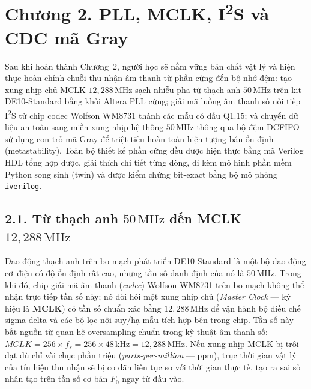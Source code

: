 \clearpage
{}
\section*{Chương 2. PLL, MCLK, I\textsuperscript{2}S và CDC mã Gray}

\begin{learningobj}
Sau khi hoàn thành Chương~2, người học sẽ nắm vững bản chất vật lý và hiện thực hoàn chỉnh chuỗi thu nhận âm thanh từ phần cứng đến bộ nhớ đệm: tạo xung nhịp chủ MCLK $12{,}288\,\text{MHz}$ sạch nhiễu pha từ thạch anh $50\,\text{MHz}$ trên kit DE10-Standard bằng khối Altera PLL cứng; giải mã luồng âm thanh số nối tiếp I\textsuperscript{2}S từ chip codec Wolfson WM8731 thành các mẫu có dấu Q1.15; và chuyển dữ liệu an toàn sang miền xung nhịp hệ thống $50\,\text{MHz}$ thông qua bộ đệm DCFIFO sử dụng con trỏ mã Gray để triệt tiêu hoàn toàn hiện tượng bán ổn định (metastability). Toàn bộ thiết kế phần cứng đều được hiện thực bằng mã Verilog HDL tổng hợp được, giải thích chi tiết từng dòng, đi kèm mô hình phần mềm Python song sinh (twin) và được kiểm chứng bit-exact bằng bộ mô phỏng \texttt{iverilog}.
\end{learningobj}

\subsection*{2.1. Từ thạch anh $50\,\text{MHz}$ đến MCLK $12{,}288\,\text{MHz}$}

\begin{physicalinsight}
Dao động thạch anh trên bo mạch phát triển DE10-Standard là một bộ dao động cơ--điện có độ ổn định rất cao, nhưng tần số danh định của nó là $50\,\text{MHz}$. Trong khi đó, chip giải mã âm thanh (\emph{codec}) Wolfson WM8731 trên bo mạch không thể nhận trực tiếp tần số này; nó đòi hỏi một xung nhịp chủ (\emph{Master Clock} --- ký hiệu là \textbf{MCLK}) có tần số chuẩn xác bằng $12{,}288\,\text{MHz}$ để vận hành bộ điều chế sigma-delta và các bộ lọc nội suy/hạ mẫu tích hợp bên trong chip. Tần số này bắt nguồn từ quan hệ oversampling chuẩn trong kỹ thuật âm thanh số: $MCLK = 256 \times f_s = 256 \times 48\,\text{kHz} = 12{,}288\,\text{MHz}$. Nếu xung nhịp MCLK bị trôi dạt dù chỉ vài chục phần triệu (\emph{parts-per-million} --- ppm), trục thời gian vật lý của tín hiệu thu nhận sẽ bị co dãn liên tục so với thời gian thực tế, tạo ra sai số nhân tạo trên tần số cơ bản $F_0$ ngay từ đầu vào.
\end{physicalinsight}

